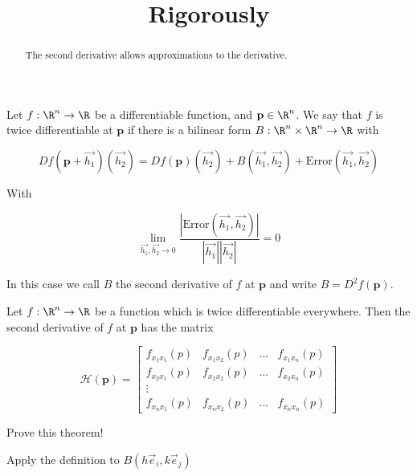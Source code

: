 \documentclass{ximera}
\title{Rigorously}
\begin{document}
	\begin{abstract}
		The second derivative allows approximations to the derivative.
	\end{abstract}\maketitle
	
\begin{definition}
	Let $f:\R^n \to \R$ be a differentiable function, and $\mathbf{p} \in \R^n$.  We say that $f$ is twice differentiable at $\mathbf{p}$
	if there is a bilinear form $B:\R^n \times \R^n \to \R$ with
	
	\[
		Df(\mathbf{p}+\vec{h_1})(\vec{h_2}) = Df(\mathbf{p})(\vec{h_2})+B(\vec{h_1},\vec{h_2})+\textrm{Error}(\vec{h_1},\vec{h_2})
	\]
	
	With 
	
	\[
		\displaystyle\lim_{\vec{h_1},\vec{h_2} \to 0} \frac{\left| \textrm{Error}(\vec{h_1},\vec{h_2}) \right| }{|\vec{h_1}| |\vec{h_2}|} = 0
	\]
	
	In this case we call $B$ the second derivative of $f$ at $\mathbf{p}$ and write $B =D^2f(\mathbf{p})$.
\end{definition}

\begin{theorem}
	Let $f:\R^n \to \R$ be a function which is twice differentiable everywhere.  Then the second derivative of $f$
	at $\mathbf{p}$ has the matrix
	
	\[ \mathcal{H}(\mathbf{p}) = \begin{bmatrix}
		 f_{x_1x_1}(p) &  f_{x_1x_2}(p) & ... &  f_{x_1x_n}(p)\\ f_{x_2x_1}(p) &  f_{x_2x_2}(p) & ... &  f_{x_2x_n}(p)\\ \vdots \\ f_{x_nx_1}(p) &  f_{x_nx_2}(p) & ... &  f_{x_nx_n}(p)
 \end{bmatrix}\]
\end{theorem}

	Prove this theorem!
	
	
	\begin{hint}
		Apply the definition to $B(h\vec{e}_i,k\vec{e}_j)$
	\end{hint}
	
\end{document}
